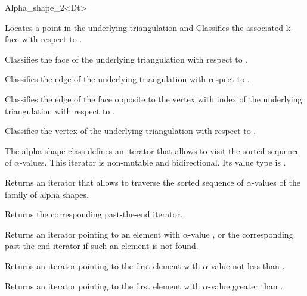 \begin{ccRefClass} {Alpha_shape_2<Dt>}


{Locates a point   in the underlying triangulation and Classifies the 
associated k-face with respect to \ccVar.}

{Classifies the face  of the underlying triangulation with respect to \ccVar.}

{Classifies the edge  of the underlying triangulation with respect to \ccVar.}

{Classifies the edge of the face  opposite to the vertex with index
of the underlying triangulation with respect to \ccVar.}	

{Classifies the vertex  of the underlying triangulation with respect to \ccVar.}



\smallskip
The alpha shape class defines an iterator that allows to visit the
sorted sequence of $\alpha$-values. This iterator is
non-mutable and bidirectional. Its value type is
.

{Returns an iterator that allows to traverse the
sorted sequence of $\alpha$-values of the family of alpha shapes.}

{Returns the corresponding past-the-end iterator.}

{Returns an iterator pointing to an element with $\alpha$-value
, or the corresponding past-the-end iterator if such 
an element is not found.}

{Returns an iterator pointing to the first element with
$\alpha$-value not less than .}

{Returns an iterator pointing to the first element with $\alpha$-value
greater than .}


\end{ccRefClass}
